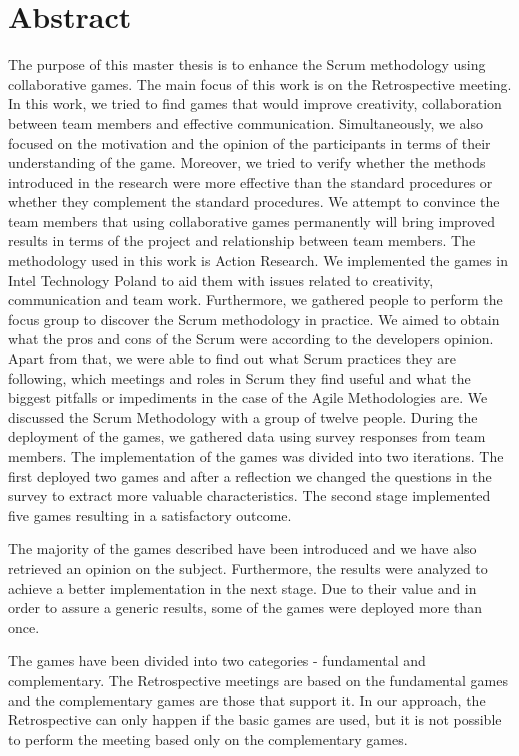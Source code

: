 \chapter*{Abstract}

\tab The purpose of this master thesis is to enhance the Scrum methodology using collaborative games. The main focus of this work is on the Retrospective meeting. In this work, we tried to find games that would improve creativity, collaboration between team members and effective communication. Simultaneously, we also focused on the motivation and the opinion of the participants in terms of their understanding of the game. Moreover, we tried to verify whether the methods introduced in the research were more effective than the standard procedures or whether they complement the standard procedures. We attempt to convince the team members that using collaborative games permanently will bring improved results in terms of the project and relationship between team members. The methodology used in this work is Action Research. We implemented the games in Intel Technology Poland to aid them with issues related to creativity, communication and team work. Furthermore, we gathered people to perform the focus group to discover the Scrum methodology in practice. We aimed to obtain what the pros and cons of the Scrum were according to the developers opinion. Apart from that, we were able to find out what Scrum practices they are following, which meetings and roles in Scrum they find useful and what the biggest pitfalls or impediments in the case of the Agile Methodologies are. We discussed the Scrum Methodology with a group of twelve people. During the deployment of the games, we gathered data using survey responses from team members. The implementation of the games was divided into two iterations. The first deployed two games and after a reflection we changed the questions in the survey to extract more valuable characteristics. The second stage implemented five games resulting in a satisfactory outcome.

\tab The majority of the games described have been introduced and we have also retrieved an opinion on the subject. Furthermore, the results were analyzed to achieve a better implementation in the next stage. Due to their value and in order to assure a generic results, some of the games were deployed more than once.

\tab The games have been divided into two categories - fundamental and complementary. The Retrospective meetings are based on the fundamental games and the complementary games are those that support it. In our approach, the Retrospective can only happen if the basic games are used, but it is not possible to perform the meeting based only on the complementary games.

